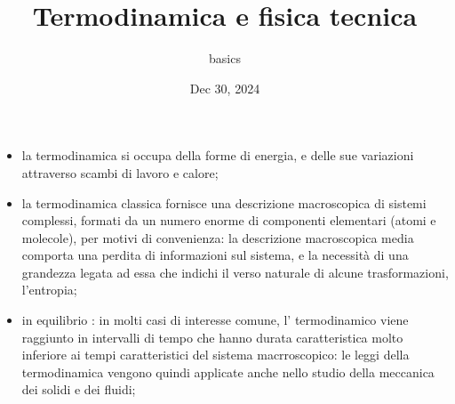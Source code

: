 \documentclass[letterpaper,10pt,english]{jupyterBook}
\title{Termodinamica e fisica tecnica}
\date{Dec 30, 2024}
\author{basics}
\begin{document}
\pagestyle{empty}
\sphinxmaketitle
\pagestyle{plain}
\sphinxtableofcontents
\pagestyle{normal}
\label{\detokenize{intro::doc}}


\sphinxAtStartPar
{}
\begin{itemize}
\item {} 
\sphinxAtStartPar
la termodinamica si occupa della forme di energia, e delle sue variazioni attraverso scambi di lavoro e calore;

\item {} 
\sphinxAtStartPar
la termodinamica classica fornisce una descrizione macroscopica di sistemi complessi, formati da un numero enorme di componenti elementari (atomi e molecole), per motivi di convenienza: la descrizione macroscopica media comporta una perdita di informazioni sul sistema, e la necessità di una grandezza legata ad essa che indichi il verso naturale di alcune trasformazioni, l’entropia;

\item {} 
\sphinxAtStartPar
in equilibrio : in molti casi di interesse comune, l’ termodinamico  viene raggiunto in intervalli di tempo che hanno durata caratteristica molto inferiore ai tempi caratteristici del sistema macrroscopico: le leggi della termodinamica vengono quindi applicate anche nello studio della meccanica dei solidi e dei fluidi;

\end{itemize}
\end{document}
